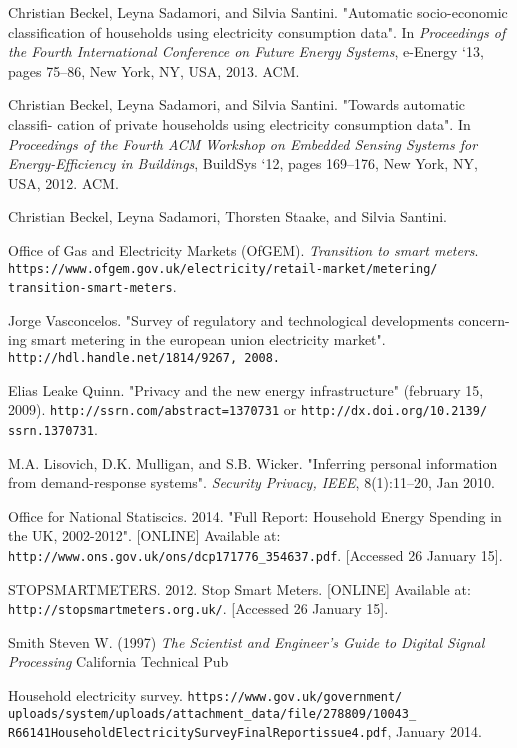 \documentclass[12pt,a4paper]{report}
\begin{document}
\begin{thebibliography}{9}

 Christian Beckel, Leyna Sadamori, and Silvia Santini. "Automatic socio-economic classification of households using electricity consumption data". In {\em Proceedings of the Fourth International Conference on Future Energy Systems}, e-Energy `13, pages 75–86, New York, NY, USA, 2013. ACM.

 Christian Beckel, Leyna Sadamori, and Silvia Santini. "Towards automatic classifi- cation of private households using electricity consumption data". In {\em Proceedings of the Fourth ACM Workshop on Embedded Sensing Systems for Energy-Efficiency in Buildings}, BuildSys `12, pages 169–176, New York, NY, USA, 2012. ACM.

 Christian Beckel, Leyna Sadamori, Thorsten Staake, and Silvia Santini.

 Office of Gas and Electricity Markets (OfGEM). {\em Transition to smart meters}. {\tt https://www.ofgem.gov.uk/electricity/retail-market/metering/ transition-smart-meters}.

 Jorge Vasconcelos. "Survey of regulatory and technological developments concern-ing smart metering in the european union electricity market". {\tt http://hdl.handle.net/1814/9267, 2008.}

 Elias Leake Quinn. "Privacy and the new energy infrastructure" (february 15, 2009). \texttt{http://ssrn.com/abstract=1370731} or \texttt{http://dx.doi.org/10.2139/ ssrn.1370731}.

 M.A. Lisovich, D.K. Mulligan, and S.B. Wicker. "Inferring personal information from demand-response systems". \textit{Security Privacy, IEEE}, 8(1):11–20, Jan 2010.

 Office for National Statiscics. 2014. "Full Report: Household Energy Spending in the UK, 2002-2012". [ONLINE] Available at: \texttt{http://www.ons.gov.uk/ons/dcp171776\_354637.pdf}. [Accessed 26 January 15].

STOPSMARTMETERS. 2012. Stop Smart Meters. [ONLINE] Available at: \texttt{http://stopsmartmeters.org.uk/}. [Accessed 26 January 15].

 Smith Steven W. (1997) \textit{The Scientist and Engineer's Guide to Digital Signal Processing} California Technical Pub

Household electricity survey. \texttt{https://www.gov.uk/government/ uploads/system/uploads/attachment\_data/file/278809/10043\_ R66141HouseholdElectricitySurveyFinalReportissue4.pdf}, January 2014.


\end{thebibliography}
\end{document}
